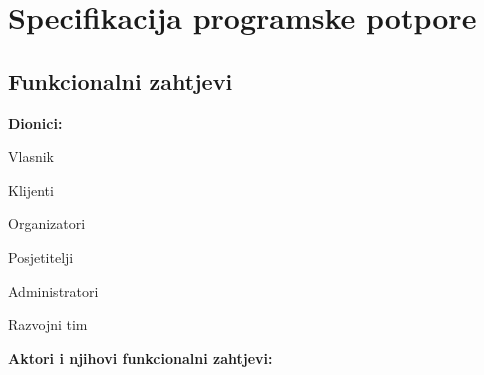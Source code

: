 \chapter{Specifikacija programske potpore}
		
	\section{Funkcionalni zahtjevi}
			
			
				
			
			
			\noindent \textbf{Dionici:}
			
			\begin{packed_enum}
				
				\item Vlasnik
				\item Klijenti
				\begin{packed_enum}
					\item Organizatori
					\item Posjetitelji
				\end{packed_enum}				
				\item Administratori
				\item Razvojni tim
				
			\end{packed_enum}
			
			\noindent \textbf{Aktori i njihovi funkcionalni zahtjevi:}

